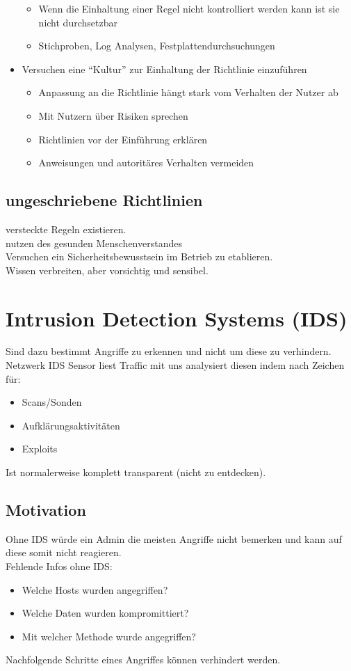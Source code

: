 \documentclass{article} %
\begin{document}
\begin{itemize}
    \begin{itemize}
        \item Wenn die Einhaltung einer Regel nicht kontrolliert werden kann ist sie nicht durchsetzbar
        \item Stichproben, Log Analysen, Festplattendurchsuchungen
    \end{itemize}
    \item Versuchen eine "`Kultur"' zur Einhaltung der Richtlinie einzuführen
    
    \begin{itemize}
        \item Anpassung an die Richtlinie hängt stark vom Verhalten der Nutzer ab
        \item Mit Nutzern über Risiken sprechen
        \item Richtlinien vor der Einführung erklären
        \item Anweisungen und autoritäres Verhalten vermeiden
    \end{itemize}
\end{itemize}
\subsection{ungeschriebene Richtlinien}
versteckte Regeln existieren.\\
nutzen des gesunden Menschenverstandes\\
Versuchen ein Sicherheitsbewusstsein im Betrieb zu etablieren.\\
Wissen verbreiten, aber vorsichtig und sensibel.


\section{Intrusion Detection Systems (IDS)}

Sind dazu bestimmt Angriffe zu erkennen und nicht um diese zu verhindern.\\
Netzwerk IDS Sensor liest Traffic mit uns analysiert diesen indem nach Zeichen für:
\begin{itemize}
	\item Scans/Sonden
    \item Aufklärungsaktivitäten
    \item Exploits
\end{itemize}
Ist normalerweise komplett transparent (nicht zu entdecken).
\subsection{Motivation}
Ohne IDS würde ein Admin die meisten Angriffe nicht bemerken und kann auf diese somit nicht reagieren.\\
Fehlende Infos ohne IDS:
\begin{itemize}
	\item Welche Hosts wurden angegriffen?
    \item Welche Daten wurden kompromittiert?
    \item Mit welcher Methode wurde angegriffen?
\end{itemize}
Nachfolgende Schritte eines Angriffes können verhindert werden.
\end{document}
